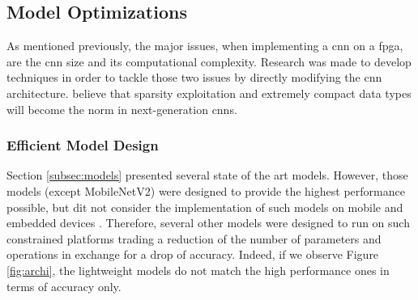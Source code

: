 \subsection{Model Optimizations} \label{subsec:mdopti}
As mentioned previously, the major issues, when implementing a \acrshort{cnn} on a \acrshort{fpga}, are the \acrshort{cnn} size and its computational complexity. Research was made to develop techniques in order to tackle those two issues by directly modifying the \acrshort{cnn} architecture. \textcite{nurvitadhi_can_2017} believe that sparsity exploitation and extremely compact data types will become the norm in next-generation \acrshort{cnn}s.
%
%
\subsubsection{Efficient Model Design}
%
Section \ref{subsec:models} presented several state of the art models. However, those models (except MobileNetV2) were designed to provide the highest performance possible, but dit not consider the implementation of such models on mobile and embedded devices \cite{iandola_squeezenet_2016}. Therefore, several other models were designed to run on such constrained platforms trading a reduction of the number of parameters and operations in exchange for a drop of accuracy. Indeed, if we observe Figure \ref{fig:archi}, the lightweight models do not match the high performance ones in terms of accuracy only.

